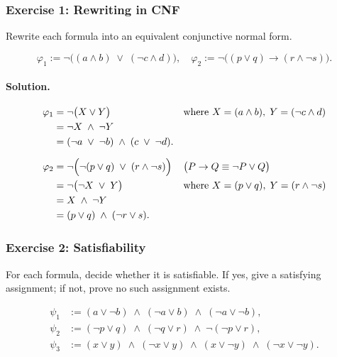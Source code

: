 \documentclass{article}
\theoremstyle{theorem}
\theoremstyle{definition}
\theoremstyle{remark}
\begin{document}
\subsubsection*{Exercise 1: Rewriting in CNF}  
Rewrite each formula into an equivalent conjunctive normal form.

\[
\varphi_1 := \neg\bigl((a\land b)\;\lor\;(\neg c\land d)\bigr),
\quad
\varphi_2 := \neg\bigl((p\lor q)\to(r\land\neg s)\bigr).
\]

\paragraph{Solution.}
\[
\begin{aligned}
\varphi_1 
&= \neg\bigl(X\lor Y\bigr)
  &&\text{where }X=(a\land b),\;Y=(\neg c\land d)\\
&= \neg X\;\land\;\neg Y\\
&= (\neg a\;\lor\;\neg b)\;\land\;(c\;\lor\;\neg d).
\\[6pt]
\varphi_2 
&= \neg\Bigl(\neg(p\lor q)\;\lor\;(r\land\neg s)\Bigr)
  &&\bigl(P\to Q\equiv\neg P\lor Q\bigr)\\
&= \neg\bigl(\neg X\;\lor\;Y\bigr)
  &&\text{where }X=(p\lor q),\;Y=(r\land\neg s)\\
&= X\;\land\;\neg Y\\
&= (p\lor q)\;\land\;(\neg r\lor s).
\end{aligned}
\]

\subsubsection*{Exercise 2: Satisfiability}  
For each formula, decide whether it is satisfiable.  If yes, give a satisfying
assignment; if not, prove no such assignment exists.

\[
\begin{aligned}
\psi_1 &:= (a\lor\neg b)\;\land\;(\neg a\lor b)\;\land\;(\neg a\lor\neg b),\\
\psi_2 &:= (\neg p\lor q)\;\land\;(\neg q\lor r)\;\land\;\neg(\neg p\lor r),\\
\psi_3 &:= (x\lor y)\;\land\;(\neg x\lor y)\;\land\;(x\lor\neg y)\;\land\;(\neg x\lor\neg y).
\end{aligned}
\]
\end{document}
